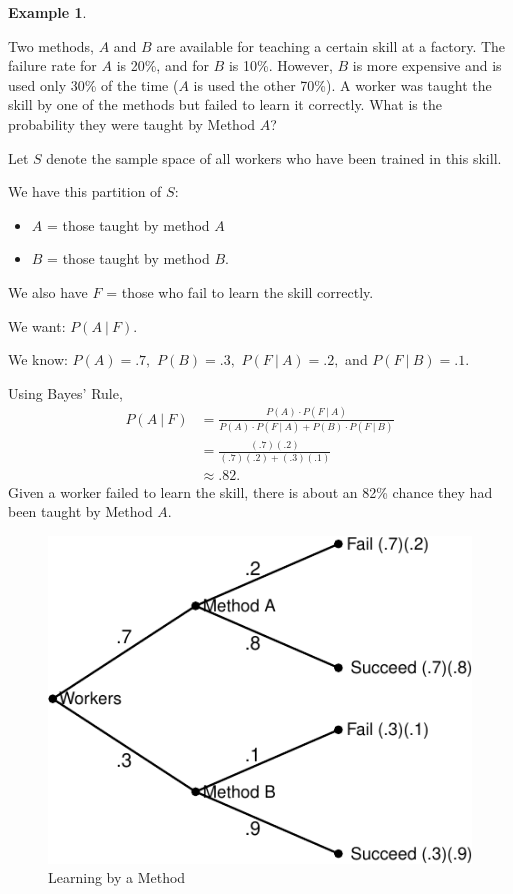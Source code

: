 \documentclass[
]{book}
\providecommand{\tightlist}{%
  \setlength{\itemsep}{0pt}\setlength{\parskip}{0pt}}
\theoremstyle{definition}
\theoremstyle{definition}
\newtheorem{example}{Example}[chapter]
\theoremstyle{definition}
\theoremstyle{definition}
\theoremstyle{remark}
\begin{document}
\begin{example}
\protect\hypertarget{exm:factory-skill}{}\label{exm:factory-skill}

Two methods, \(A\) and \(B\) are available for teaching a certain skill at a factory. The failure rate for \(A\) is 20\%, and for \(B\) is 10\%. However, \(B\) is more expensive and is used only 30\% of the time (\(A\) is used the other 70\%). A worker was taught the skill by one of the methods but failed to learn it correctly. What is the probability they were taught by Method \(A\)?

Let \(S\) denote the sample space of all workers who have been trained in this skill.

We have this partition of \(S\):

\begin{itemize}
\tightlist
\item
  \(A\) = those taught by method \(A\)
\item
  \(B\) = those taught by method \(B\).
\end{itemize}

We also have \(F\) = those who fail to learn the skill correctly.

We want: \(P(A~|~F)\).

We know: \(P(A) = .7,\) \(P(B) = .3,\) \(P(F~|~A) = .2,\) and \(P(F~|~B) = .1\).

Using Bayes' Rule,
\begin{align*}
P(A~|~F) &= \frac{P(A)\cdot P(F~|~A)}{P(A)\cdot P(F~|~A)+P(B)\cdot P(F~|~B)}\\
&= \frac{(.7)(.2)}{(.7)(.2)+(.3)(.1)}\\
&\approx .82.
\end{align*}
Given a worker failed to learn the skill, there is about an 82\% chance they had been taught by Method \(A\).

\begin{figure}
\centering
\includegraphics{math340-notes_files/figure-latex/bayes-instruct-method-1.pdf}
\caption{\label{fig:bayes-instruct-method}Learning by a Method}
\end{figure}

\end{example}
\end{document}
